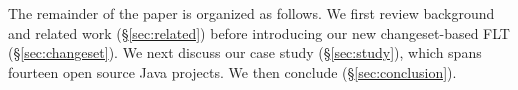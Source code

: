 The remainder of the paper is organized as follows.
We first review background and related work (\S\ref{sec:related})
before introducing our new changeset-based FLT (\S\ref{sec:changeset}).
We next discuss our case study (\S\ref{sec:study}), which spans fourteen open source Java projects.
We then conclude (\S\ref{sec:conclusion}).


